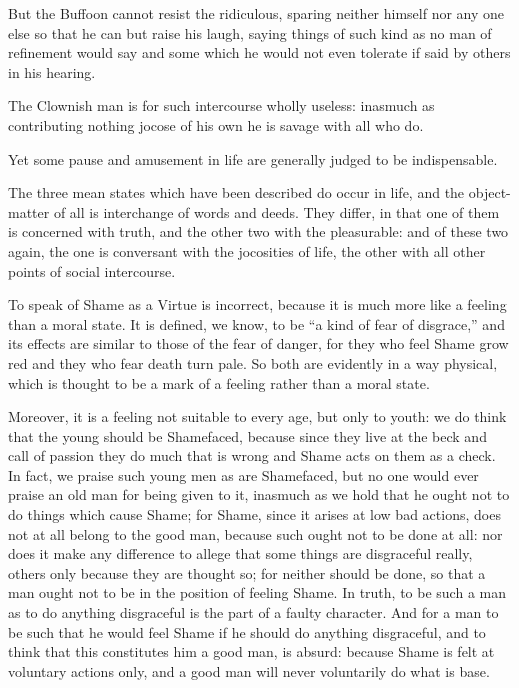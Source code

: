 But the Buffoon cannot resist the ridiculous, sparing neither himself nor any
one else so that he can but raise his laugh, saying things of such kind as no
man of refinement would say and some which he would not even tolerate if said
by others in his hearing.

The Clownish man is for such intercourse wholly useless: inasmuch as
contributing nothing jocose of his own he is savage with all who do.

Yet some pause and amusement in life are generally judged to be indispensable.

The three mean states which have been described do occur in life, and the
object-matter of all is interchange of words and deeds. They differ, in that
one of them is concerned with truth, and the other two with the pleasurable:
and of these two again, the one is conversant with the jocosities of life, the
other with all other points of social intercourse.


To speak of Shame as a Virtue is incorrect, because it is much more like a
feeling than a moral state. It is defined, we know, to be “a kind of fear
of disgrace,” and its effects are similar to those of the fear of danger,
for they who feel Shame grow red and they who fear death turn pale. So both are
evidently in a way physical, which is thought to be a mark of a feeling rather
than a moral state.

Moreover, it is a feeling not suitable to every age, but only to youth: we do
think that the young should be Shamefaced, because since they live at the beck
and call of passion they do much that is wrong and Shame acts on them as a
check. In fact, we praise such young men as are Shamefaced, but no one would
ever praise an old man for being given to it, inasmuch as we hold that he ought
not to do things which cause Shame; for Shame, since it arises at low bad
actions, does not at all belong to the good man, because such ought not to be
done at all: nor does it make any difference to allege that some things are
disgraceful really, others only because they are thought so; for neither should
be done, so that a man ought not to be in the position of feeling Shame. In
truth, to be such a man as to do anything disgraceful is the part of a faulty
character. And for a man to be such that he would feel Shame if he should do
anything disgraceful, and to think that this constitutes him a good man, is
absurd: because Shame is felt at voluntary actions only, and a good man will
never voluntarily do what is base.

